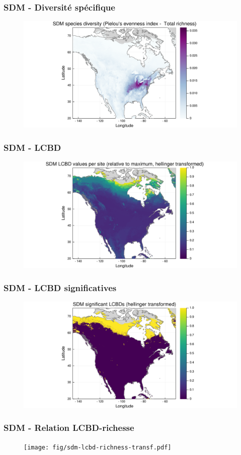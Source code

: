 \documentclass[10pt]{beamer}
\begin{document}
\begin{frame}
  \frametitle{SDM - Diversité spécifique}
  \begin{figure}
    \centering
    \includegraphics[scale=0.4]{fig/sdm-diversity-pielou2.pdf}
  \end{figure}
\end{frame}

\begin{frame}
  \frametitle{SDM - LCBD}
  \begin{figure}
    \centering
    \includegraphics[scale=0.4]{fig/sdm-lcbd-transf.pdf}
  \end{figure}
\end{frame}

\begin{frame}
  \frametitle{SDM - LCBD significatives}
  \begin{figure}
    \centering
    \includegraphics[scale=0.4]{fig/sdm-lcbd-signif.pdf}
  \end{figure}
\end{frame}

\begin{frame}
  \frametitle{SDM - Relation LCBD-richesse}
  \begin{figure}
    \centering
    \texttt{[image: fig/sdm-lcbd-richness-transf.pdf]}
  \end{figure}
\end{frame}
\end{document}
